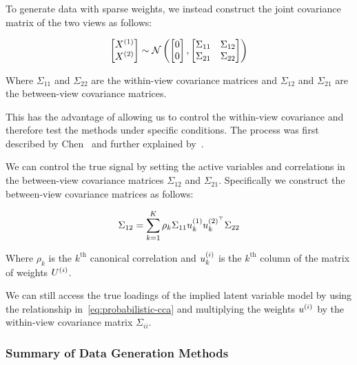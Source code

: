 To generate data with sparse weights, we instead construct the joint covariance matrix\citep{mai2019iterative,chen2013sparse} of the two views as follows:

\begin{align}\label{eq:covariance}
    \begin{bmatrix} X^{(1)} \\ X^{(2)} \end{bmatrix} \sim \mathcal{N} \left( \begin{bmatrix} 0 \\ 0 \end{bmatrix}, \begin{bmatrix} \Sigma_{11} & \Sigma_{12} \\ \Sigma_{21} & \Sigma_{22} \end{bmatrix} \right)
\end{align}

Where $\Sigma_{11}$ and $\Sigma_{22}$ are the within-view covariance matrices and $\Sigma_{12}$ and $\Sigma_{21}$ are the between-view covariance matrices.

This has the advantage of allowing us to control the within-view covariance and therefore test the methods under specific conditions.
The process was first described by Chen~\citep{chen2013sparse} and further explained by~\citep{suo2017sparse}.

We can control the true signal by setting the active variables and correlations in the between-view covariance matrices $\Sigma_{12}$ and $\Sigma_{21}$.
Specifically we construct the between-view covariance matrices as follows:

\begin{align}
    \Sigma_{12}=\sum_{k=1}^{K}\rho_k\Sigma_{11}u^{(1)}_{k}u^{(2)^{\top}}_k\Sigma_{22}
\end{align}

Where $\rho_k$ is the $k^{\text{th}}$ canonical correlation and $u^{(i)}_k$ is the $k^{\text{th}}$ column of the matrix of weights $U^{(i)}$.

We can still access the true loadings of the implied latent variable model by using the relationship in~\ref{eq:probabilistic-cca} and multiplying the weights $u^{(i)}$ by the within-view covariance matrix $\Sigma_{ii}$.

\subsubsection{Summary of Data Generation Methods}

